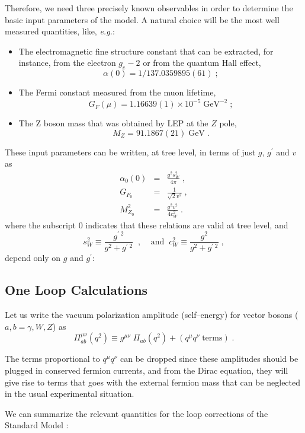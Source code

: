 \documentclass[12pt]{report}
\begin{document}
Therefore, we need three precisely known observables in order
to determine the basic input parameters of the model. A natural choice
will be the most well measured quantities, like, {\it e.g.}:
\begin{itemize}
\item The electromagnetic fine structure constant that can be
extracted, for instance, from the electron $g_e-2$ or from the quantum
Hall effect,
\[
\alpha (0)  = 1/137.0359895 (61)  \; ;
\]
\item The Fermi constant measured from the muon lifetime,
\[
G_F (\mu) = 1.16639 (1)  \times 10^{-5} \; \mbox{GeV}^{-2} \; ;
\]
\item The Z boson mass that was obtained by LEP at the $Z$ pole,
\[
M_Z = 91.1867(21) \; \mbox{GeV} \; .
\]
\end{itemize}
These input parameters can be written, at tree level, in terms of  
just $g$, $g^\prime$ and $v$ as
\begin{eqnarray}
\alpha_0 (0) &=& \frac{g^2 s_W^2}{4\pi} \; ,
\nonumber \\
G_{F_0} &=&  \frac{1}{\sqrt{2} v^2} \; , \\
M_{Z_0}^2 &=& \frac{g^2 v^2}{4 c_W^2}   \; . \nonumber
\label{input}
\end{eqnarray}
where the subscript $0$ indicates that these relations are valid at
tree level, and
\[
s_W^2 \equiv \frac{g^{\prime \; 2}}{g^2 + g^{\prime \; 2}}
\;\; , \;\;\;\; \mbox{and} \;\; 
{c_W^2} \equiv \frac{g^{2}}{g^2 + g^{\prime \; 2}}  \; ,
\]
depend only on $g$ and $g^\prime$:


\subsection{One Loop Calculations} \indent


Let us write the vacuum polarization amplitude (self--energy)
for vector bosons ($a, b = \gamma, W, Z$) as
\[
\Pi^{\mu\nu}_{ab} (q^2) \equiv g^{\mu\nu} \; \Pi_{ab}(q^2) + (q^\mu
q^\nu \;
\mbox{terms}) \; .
\]     

The terms proportional to $q^\mu q^\nu$ can be dropped since these
amplitudes should be plugged in conserved fermion currents, and from the
Dirac equation, they will give rise to terms that goes with the external
fermion mass that can be neglected in the usual experimental situation.

We can summarize the relevant quantities for the loop corrections of
the Standard Model \cite{Barbieri:95}:
\end{document}
